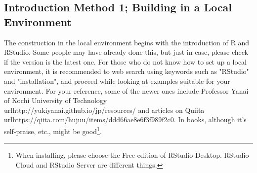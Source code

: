 \documentclass{ltjsbook}
\begin{document}
\subsection{Introduction Method 1; Building in a Local Environment}

The construction in the local environment begins with the introduction of R and RStudio. Some people may have already done this, but just in case, please check if the version is the latest one.
For those who do not know how to set up a local environment, it is recommended to web search using keywords such as "RStudio" and "installation", and proceed while looking at examples suitable for your environment.
For your reference, some of the newer ones include Professor Yanai of Kochi University of Technology\\url{http://yukiyanai.github.io/jp/resources/} and articles on Quiita\\url{https://qiita.com/hujuu/items/ddd66ae8e6f3f989f2c0}.
In books, although it's self-praise, \textcite{kosugi2019} etc., might be good\footnote{When installing, please choose the Free edition of RStudio Desktop. RStudio Cloud and RStudio Server are different things.}.
\end{document}
